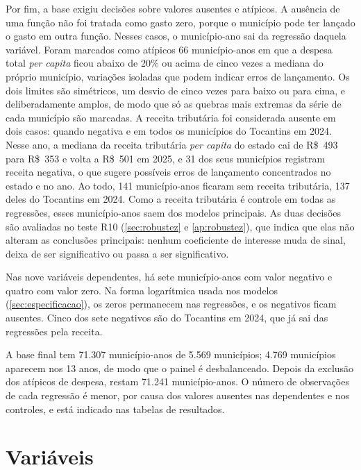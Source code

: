Por fim, a base exigiu decisões sobre valores ausentes e atípicos. A ausência de uma função não foi tratada como gasto zero, porque o município pode ter lançado o gasto em outra função. Nesses casos, o município-ano sai da regressão daquela variável. Foram marcados como atípicos 66 município-anos em que a despesa total \textit{per capita} ficou abaixo de 20\% ou acima de cinco vezes a mediana do próprio município, variações isoladas que podem indicar erros de lançamento. Os dois limites são simétricos, um desvio de cinco vezes para baixo ou para cima, e deliberadamente amplos, de modo que só as quebras mais extremas da série de cada município são marcadas. A receita tributária foi considerada ausente em dois casos: quando negativa e em todos os municípios do Tocantins em 2024. Nesse ano, a mediana da receita tributária \textit{per capita} do estado cai de R\$~493 para R\$~353 e volta a R\$~501 em 2025, e 31 dos seus municípios registram receita negativa, o que sugere possíveis erros de lançamento concentrados no estado e no ano. Ao todo, 141 município-anos ficaram sem receita tributária, 137 deles do Tocantins em 2024. Como a receita tributária é controle em todas as regressões, esses município-anos saem dos modelos principais. As duas decisões são avaliadas no teste R10 (\autoref{sec:robustez} e \autoref{ap:robustez}), que indica que elas não alteram as conclusões principais: nenhum coeficiente de interesse muda de sinal, deixa de ser significativo ou passa a ser significativo.

Nas nove variáveis dependentes, há sete município-anos com valor negativo e quatro com valor zero. Na forma logarítmica usada nos modelos (\autoref{sec:especificacao}), os zeros permanecem nas regressões, e os negativos ficam ausentes. Cinco dos sete negativos são do Tocantins em 2024, que já sai das regressões pela receita.

A base final tem 71.307 município-anos de 5.569 municípios; 4.769 municípios aparecem nos 13 anos, de modo que o painel é desbalanceado. Depois da exclusão dos atípicos de despesa, restam 71.241 município-anos. O número de observações de cada regressão é menor, por causa dos valores ausentes nas dependentes e nos controles, e está indicado nas tabelas de resultados.

\section{Variáveis}\label{sec:variaveis}

